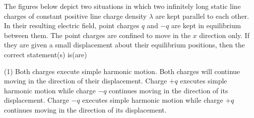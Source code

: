 

    \item The figures below depict two situations in which two infinitely long static line charges of constant positive line charge density $\lambda$ are kept parallel to each other. In their resulting electric field, point charges $q$ and $-q$ are kept in equilibrium between them. The point charges are confined to move in the $x$ direction only. If they are given a small displacement about their equilibrium positions, then the correct statement(s) is(are)
        \begin{center}
        \end{center}
        \begin{tasks}(1)
            \task Both charges execute simple harmonic motion.
            \task Both charges will continue moving in the direction of their displacement.
            \task Charge $+q$ executes simple harmonic motion while charge $-q$ continues moving in the direction of its displacement.
            \task Charge $-q$ executes simple harmonic motion while charge $+q$ continues moving in the direction of its displacement.
        \end{tasks}



